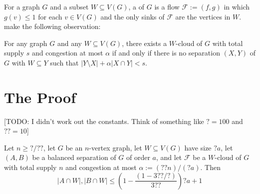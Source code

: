 \documentclass{patmorin}
\begin{document}
For a graph $G$ and a subset $W\subseteq V(G)$, a  of $G$ is a flow $\mathcal{F}:=(f,g)$ in which $g(v)\le 1$ for each $v\in V(G)$ and the only sinks of $\mathcal{F}$ are the vertices in $W$.  \citet{dvorak.norin:treewidth} make the following observation:

\begin{obs}
  For any graph $G$ and any $W\subseteq V(G)$, there exists a $W$-cloud of $G$ with total supply $s$ and congestion at most $\alpha$ if and only if there is no separation $(X,Y)$ of $G$ with $W\subseteq Y$ such that $|Y\setminus X| + \alpha|X\cap Y| < s$.
\end{obs}

\section{The Proof}

[TODO: I didn't work out the constants. Think of something like ${?}=100$ and ${??}=10$]

\begin{lem}\label{balanced_on_w}
  Let $n\ge {?}/{??}$, let $G$ be an $n$-vertex graph, let $W\subseteq V(G)$ have size ${?}a$, let $(A,B)$ be a balanced separation of $G$ of order $a$, and let $\mathcal{F}$ be a $W$-cloud of $G$ with total supply $n$ and congestion at most $\alpha:=({??}n)/({?}a)$.  Then
  \[
  |A\cap W|,|B\cap W|\le \left(1-\frac{(1-3{??}/{?})}{3{??}}\right)?a + 1
  \]
\end{lem}
\end{document}
